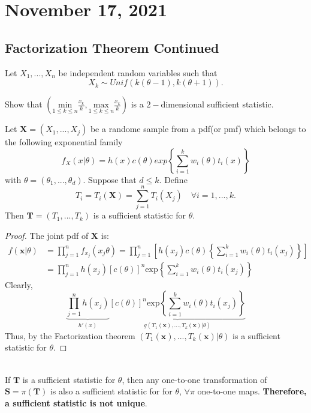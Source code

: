 \section{November 17, 2021}
\subsection{Factorization Theorem Continued}
\begin{example}
    Let $X_1,...,X_n$ be independent random variables such that $$X_k \sim Unif(k(\theta -1), k(\theta+1)).$$
    
    Show that $ \left ( \displaystyle \underset{1 \leq k \leq n}{\mathrm{min}} \frac{x_k}{k}, \underset{1 \leq k \leq n}{\mathrm{max}} \frac{x_k}{k}
    \right )$ is a $2-$dimensional sufficient statistic. 
    
\end{example}

\begin{theorem}
    Let $\boldsymbol{X} = (X_1,...,X_j)$ be a randome sample from a pdf(or pmf) which belongs to the following exponential family
    $$
    f_X(x|\theta) = h(x)c(\theta)exp 
    \left \{ 
    \sum_{i=1}^{k}w_i(\theta)t_i(x)
    \right \}
    $$
    with $\theta = (\theta_1,...,\theta_d)$. Suppose that $d \leq k$. Define 
    $$T_i = T_i(\boldsymbol{X}) = \sum_{j=1}^{n}T_i(X_j)
    \quad \forall i=1,...,k.$$
    Then $\boldsymbol{T} = (T_1,...,T_k)$ is a sufficient statistic for $\theta$.
\end{theorem}
\begin{proof}
    The joint pdf of $\boldsymbol{X}$ is:
    \begin{align*}
    f(\boldsymbol{x}|\theta) & = 
    \prod_{j=1}^{n}f_{x_j}(x_j \theta) 
    = \prod_{j=1}^{n} \left[
    h(x_j)c(\theta) \left \{
    \sum_{i=1}^{k}w_i(\theta)t_i(x_j)
    \right\}
    \right ] \\
    & = \prod_{j=1}^{n}h(x_j)[c(\theta)]^n \mathrm{exp} \left \{
    \sum_{i=1}^{k}w_i(\theta)t_i(x_j)
    \right\}
    \end{align*}
    Clearly, 
    $$
    \underbrace{ \prod_{j=1}^{n}h(x_j)}_{h'(x)}
    \underbrace{[c(\theta)]^n\mathrm{exp} \left \{
    \sum_{i=1}^{k}w_i(\theta)t_i(x_j)
    \right\}}_{g(T_1(\boldsymbol{x}),...,T_k(\boldsymbol{x})|\theta)}
    $$
    Thus, by the Factorization theorem $(T_1(\boldsymbol{x}),...,T_k(\boldsymbol{x})|\theta)$ is a sufficient statistic for $\theta$.
\end{proof}
\\
 If $\boldsymbol{T}$ is a sufficient statistic for $\theta$, then any one-to-one transformation of $\boldsymbol{S} = \pi(\boldsymbol{T})$ is also a sufficient statistic for for $\theta$, $\forall \pi$ one-to-one maps. \textbf{Therefore, a sufficient statistic is not unique}. 
